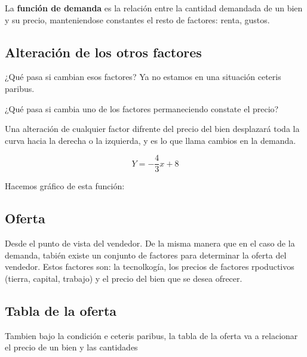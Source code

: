 La \textbf{función de demanda} es la relación entre la cantidad demandada de un bien y su precio,
manteniendose constantes el resto de factores: renta, gustos.

\subsection{Alteración de los otros factores}

¿Qué pasa si cambian esos factores?
Ya no estamos en una situación ceteris paribus.

¿Qué pasa si cambia uno de los factores permaneciendo constate el precio?

Una alteración de cualquier factor difrente del precio del bien desplazará toda la curva hacia la derecha o la izquierda,
y es lo que llama cambios en la demanda.

\begin{equation*}
    Y = -\frac{4}{3}x + 8
\end{equation*}

Hacemos gráfico de esta función:

\begin{center}
\end{center}

\subsection{Oferta}

Desde el punto de vista del vendedor.
De la misma manera que en el caso de la demanda,
tabién existe un conjunto de factores para determinar la oferta del vendedor.
Estos factores son: la tecnolkogía, los precios de factores rpoductivos (tierra, capital, trabajo)
y el precio del bien que se desea ofrecer.

\subsection{Tabla de la oferta}

Tambien bajo la condición e ceteris paribus, la tabla de la oferta va a relacionar
el precio de un bien y las cantidades

